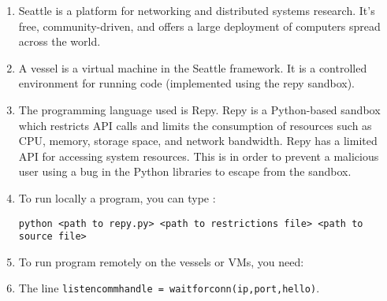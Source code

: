 \documentclass[12pt]{article}
\begin{document}
\begin{enumerate}
\item Seattle is a platform for networking and distributed systems research. It's free, community-driven, and offers a large deployment of computers spread across the world.

\item A vessel is a virtual machine in the Seattle framework. It is a controlled environment for running code (implemented using the repy sandbox).

\item The programming language used is Repy. Repy is a Python-based sandbox which restricts API calls and limits the consumption of resources such as CPU, memory, storage space, and network bandwidth. Repy has a limited API for accessing system resources. This is in order to prevent a malicious user using a bug in the Python libraries to escape from the sandbox.

\item To run locally a program, you can type : 

\texttt{python <path to repy.py> <path to restrictions file> <path to source file>}

\item  To run program remotely on the vessels or VMs, you need: 


\item The line \texttt{listencommhandle = waitforconn(ip,port,hello)}.


\end{enumerate}
\end{document}
